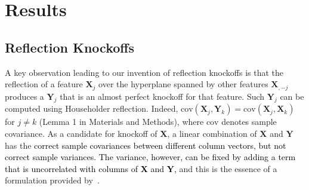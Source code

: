 \documentclass[12pt,Times]{article}
\def\cite{\citep}
\def\tcb{\textcolor{black}}
\def\X{{\mathbf{X}}}
\def\Y{{\mathbf{Y}}}
\def\cov{{\textrm{cov}}}
\begin{document}
%
%
%
 



\section{Results}

\subsection{Reflection Knockoffs}

A key observation leading to our invention of reflection knockoffs is that the reflection of a feature $\X_j$ over the hyperplane spanned by other features $\X_{,-j}$ produces a $\Y_j$ that is an almost perfect knockoff for that feature. Such $\Y_j$ can be computed using Householder reflection.  Indeed, $\cov(\X_j, \Y_k) = \cov(\X_j, \X_k)$ for $j \ne k$ (Lemma 1 in Materials and Methods), where $\cov$ denotes sample covariance. As a candidate for knockoff of $\X$, a linear combination of $\X$ and $\Y$ has the \tcb{correct sample covariances between different column vectors, but not correct sample variances.}  \tcb{The variance, however, can be fixed by adding a term that is uncorrelated with columns of $\X$ and $\Y$,} and this is the essence of a formulation provided by~\citet{barber.candes.15}.  
\end{document}
